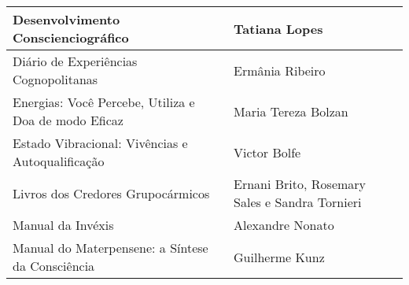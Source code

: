 \documentclass{gescons}
\begin{document}
\begin{longtable}[]{@{}
  >{\raggedright\arraybackslash}p{}
  >{\raggedright\arraybackslash}p{}@{}}
\begin{minipage}[b]{\linewidth}
Desenvolvimento Conscienciográfico
\end{minipage} & \begin{minipage}[b]{\linewidth}\raggedright
Tatiana Lopes
\end{minipage} \\
\hline
\begin{minipage}[b]{\linewidth}\raggedright
Diário de Experiências Cognopolitanas
\end{minipage} & \begin{minipage}[b]{\linewidth}\raggedright
Ermânia Ribeiro
\end{minipage} \\
\hline
\begin{minipage}[b]{\linewidth}\raggedright
Energias: Você Percebe, Utiliza e Doa de modo Eficaz
\end{minipage} & \begin{minipage}[b]{\linewidth}\raggedright
Maria Tereza Bolzan
\end{minipage} \\
\hline
\begin{minipage}[b]{\linewidth}\raggedright
Estado Vibracional: Vivências e Autoqualificação
\end{minipage} & \begin{minipage}[b]{\linewidth}\raggedright
Victor Bolfe
\end{minipage} \\
\hline
\begin{minipage}[b]{\linewidth}\raggedright
Livros dos Credores Grupocármicos
\end{minipage} & \begin{minipage}[b]{\linewidth}\raggedright
Ernani Brito, Rosemary Sales e Sandra Tornieri
\end{minipage} \\
\hline
\begin{minipage}[b]{\linewidth}\raggedright
Manual da Invéxis
\end{minipage} & \begin{minipage}[b]{\linewidth}\raggedright
Alexandre Nonato
\end{minipage} \\
\hline
\begin{minipage}[b]{\linewidth}\raggedright
Manual do Materpensene: a Síntese da Consciência
\end{minipage} & \begin{minipage}[b]{\linewidth}\raggedright
Guilherme Kunz
\end{minipage} \\

\end{longtable}
\end{document}
